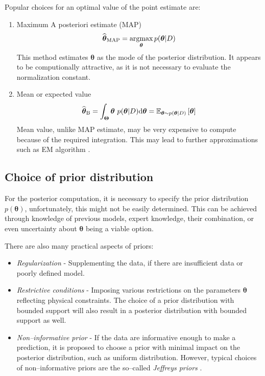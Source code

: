 Popular choices for an optimal value of the point estimate are:
\begin{enumerate}
	\item Maximum A posteriori estimate (MAP)
	\begin{equation}
		\widehat{\boldsymbol{\theta}}_{\mathrm{MAP}} = \mathop{\mathrm{argmax}}_{\boldsymbol{\theta}} p(\boldsymbol{\theta} | D)
	\end{equation}
This method estimates $\boldsymbol{\theta}$ as the mode of the posterior distribution. It appears to be computionally attractive, as it is not necessary to evaluate the normalization constant. 
\item Mean or expected value
\begin{equation}
	\widehat{\boldsymbol{\theta}}_{\mathrm{B}} = \int_{\boldsymbol{\Theta}} \boldsymbol{\theta}~ p(\boldsymbol{\theta} | D) \mathrm{d}\boldsymbol{\theta} = \mathbb{E}_{\boldsymbol{\theta} \sim p(\boldsymbol{\theta} | D) }\left[\boldsymbol{\theta} \right]
\end{equation}
Mean value, unlike MAP estimate, may be very expensive to compute because of the required integration. This may lead to further approximations such as EM algorithm \cite{EM}.
\end{enumerate}	

\subsection{Choice of prior distribution}
For the posterior computation, it is necessary to specify the prior distribution $p(\boldsymbol{\theta})$, unfortunately, this might not be easily determined. This can be achieved through knowledge of previous models, expert knowledge, their combination, or even uncertainty about $\boldsymbol{\theta}$ being a viable option. 

There are also many practical aspects of priors:
\begin{itemize}
	\item \emph{Regularization} - Supplementing the data, if there are insufficient data or poorly defined model. 
	\item \emph{Restrictive conditions} - Imposing various restrictions on the parameters $\boldsymbol{\theta}$ reflecting physical constraints. The choice of a prior distribution with bounded support will also result in a posterior distribution with bounded support as well. 
	\item \emph{Non--informative prior} - If the data are informative enough to make a prediction, it is proposed to choose a prior with minimal impact on the posterior distribution, such as uniform distribution. However, typical choices of non--informative priors are the so--called \emph{Jeffreys priors} \cite{jeffrey}.
\end{itemize}



